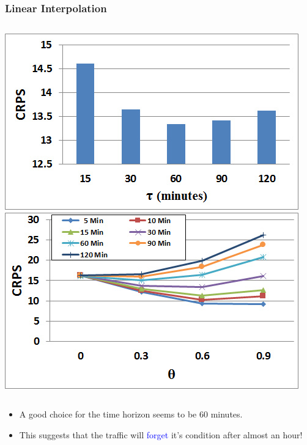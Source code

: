 \documentclass[t]{beamer}
\begin{document}
\begin{frame}\frametitle{Linear Interpolation}
\vspace{0.5in}
\begin{columns}
		\includegraphics[scale=0.3]{Links_Interpolated_TimeHorizon.jpg}
		\includegraphics[scale=0.3]{Links_Interpolated_Theta.jpg}
\end{columns}
\begin{itemize}
\item A good choice for the time horizon seems to be \textcolor{mygreen}{60 minutes}.
\item<2-> This suggests that the traffic will \textcolor{blue}{forget} it's condition after almost an hour!
\end{itemize}
\end{frame}
\end{document}
